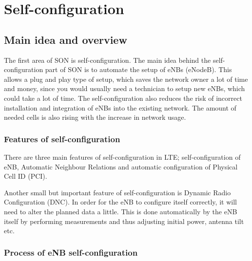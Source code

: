 \documentclass{report}
\begin{document}
\chapter{Self-configuration}
\section{Main idea and overview}
The first area of SON is self-configuration. The main idea behind the self-configuration part of SON is to automate the setup of eNBs (eNodeB). This allows a plug and play type of setup, which saves the network owner a lot of time and money, since you would usually need a technician to setup new eNBs, which could take a lot of time.  
The self-configuration also reduces the risk of incorrect installation and integration of eNBs into the existing network. The amount of needed cells is also rising with the increase in network usage.

\subsection{Features of self-configuration}
There are three main features of self-configuration in LTE; self-configuration of eNB, Automatic Neighbour Relations and automatic configuration of Physical Cell ID (PCI). 

Another small but important feature of self-configuration is Dynamic Radio Configuration (DNC). 
In order for the eNB to configure itself correctly, it will need to alter the planned data a little. This is done automatically by the eNB itself by performing measurements and thus adjusting initial power, antenna tilt etc. %


\subsection{Process of eNB self-configuration}
\end{document}
